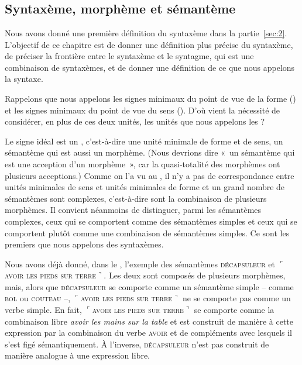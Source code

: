 \chapter{}\label{sec:3.1}

\section{Syntaxème, morphème et sémantème}\label{sec:3.1.0}\largerpage

Nous avons donné une première définition du syntaxème dans la partie~\ref{sec:2}. L’objectif de ce chapitre est de donner une définition plus précise du syntaxème, de préciser la frontière entre le syntaxème et le syntagme, qui est une combinaison de syntaxèmes, et de donner une définition de ce que nous appelons la syntaxe.

Rappelons que nous appelons  les signes minimaux du point de vue de la forme () et  les signes minimaux du point de vue du sens (). D’où vient la nécessité de considérer, en plus de ces deux unités, les unités que nous appelons les ?

Le signe idéal est un , c’est-à-dire une unité minimale de forme et de sens, un sémantème qui est aussi un morphème. (Nous devrions dire «~un sémantème qui est une acception d’un morphème~», car la quasi-totalité des morphèmes ont plusieurs acceptions.) Comme on l’a vu au , il n’y a pas de correspondance entre unités minimales de sens et unités minimales de forme et un grand nombre de sémantèmes sont complexes, c’est-à-dire sont la combinaison de plusieurs morphèmes. Il convient néanmoins de distinguer, parmi les sémantèmes complexes, ceux qui se comportent comme des sémantèmes simples et ceux qui se comportent plutôt comme une combinaison de sémantèmes simples. Ce sont les premiers que nous appelons des syntaxèmes.

Nous avons déjà donné, dans le , l’exemple des sémantèmes \textsc{décapsuleur} et $⌜$\textsc{avoir} \textsc{les} \textsc{pieds} \textsc{sur} \textsc{terre}$⌝$. Les deux sont composés de plusieurs morphèmes, mais, alors que \textsc{décapsuleur} se comporte comme un sémantème simple – comme \textsc{bol} ou \textsc{couteau} –, $⌜$\textsc{avoir} \textsc{les} \textsc{pieds} \textsc{sur} \textsc{terre}$⌝$ ne se comporte pas comme un verbe simple. En fait, $⌜$\textsc{avoir} \textsc{les} \textsc{pieds} \textsc{sur} \textsc{terre}$⌝$ se comporte comme la combinaison libre \textit{avoir les mains sur la table} et est construit de manière  à cette expression par la combinaison du verbe \textsc{avoir} et de compléments avec lesquels il s’est figé sémantiquement. À l’inverse, \textsc{décapsuleur} n’est pas construit de manière analogue à une expression libre.

